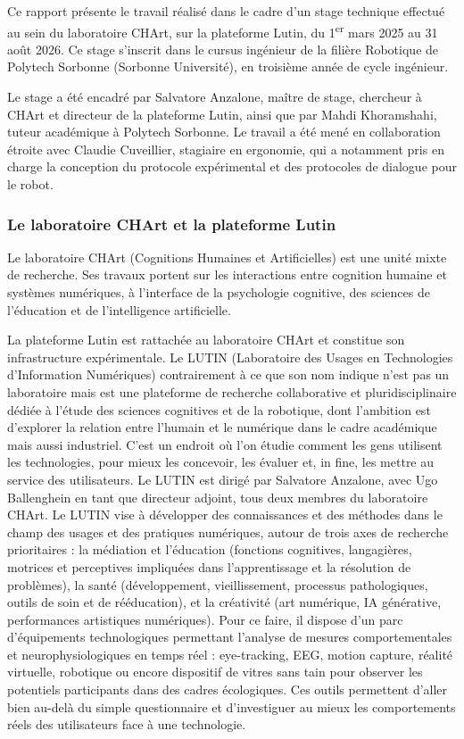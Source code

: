 \documentclass[11pt]{article}
\begin{document}
Ce rapport présente le travail réalisé dans le cadre d'un stage technique effectué au sein du
laboratoire CHArt, sur la plateforme Lutin, du 1\textsuperscript{er} mars 2025 au 31 août 2026.
Ce stage s'inscrit dans le cursus ingénieur de la filière Robotique de Polytech Sorbonne
(Sorbonne Université), en troisième année de cycle ingénieur.

Le stage a été encadré par Salvatore Anzalone, maître de stage, chercheur à CHArt et directeur
de la plateforme Lutin, ainsi que par Mahdi Khoramshahi, tuteur académique à Polytech Sorbonne.
Le travail a été mené en collaboration étroite avec Claudie Cuveillier, stagiaire en ergonomie, qui a notamment pris en charge la conception du protocole expérimental et des protocoles de dialogue pour le robot.

\subsubsection{Le laboratoire CHArt et la plateforme Lutin}

Le laboratoire CHArt (Cognitions Humaines et Artificielles) est une unité mixte de recherche.
Ses travaux portent sur les interactions entre cognition humaine et systèmes numériques, à
l'interface de la psychologie cognitive, des sciences de l'éducation et de l'intelligence
artificielle.

La plateforme Lutin est rattachée au laboratoire CHArt et constitue son infrastructure expérimentale.
Le LUTIN (Laboratoire des Usages en Technologies d'Information Numériques) contrairement à
ce que son nom indique n’est pas un laboratoire mais est une plateforme de recherche collaborative
et pluridisciplinaire dédiée à l'étude des sciences cognitives et de la robotique, dont l'ambition
est d'explorer la relation entre l'humain et le numérique dans le cadre académique mais aussi industriel.
C'est un endroit où l'on étudie comment les gens utilisent les technologies, pour mieux les concevoir, les évaluer et,
in fine, les mettre au service des utilisateurs.
Le LUTIN est dirigé par Salvatore Anzalone, avec Ugo Ballenghein en tant que directeur adjoint,
tous deux membres du laboratoire CHArt.
Le LUTIN vise à développer des connaissances et des méthodes dans le champ des usages et des pratiques numériques, autour de trois axes de recherche prioritaires : la médiation et l'éducation (fonctions cognitives, langagières, motrices et perceptives impliquées dans l'apprentissage et la résolution de problèmes), la santé (développement, vieillissement, processus pathologiques, outils de soin et de rééducation), et la créativité (art numérique, IA générative, performances artistiques numériques). Pour ce faire, il dispose d’un parc d’équipements technologiques permettant l’analyse de mesures comportementales et neurophysiologiques en temps réel : eye-tracking, EEG, motion capture, réalité virtuelle, robotique ou encore dispositif de vitres sans tain pour observer les potentiels participants dans des cadres écologiques. Ces outils permettent d’aller bien au-delà du simple questionnaire et d’investiguer au mieux les comportements réels des utilisateurs face à une technologie.
\end{document}
